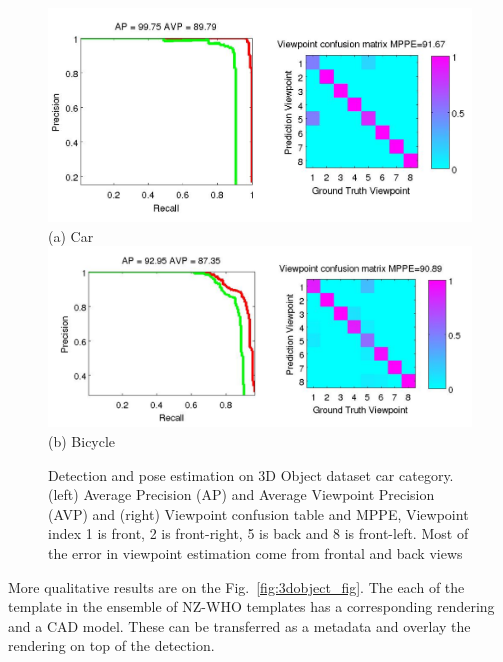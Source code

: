 \documentclass[10pt,twocolumn,letterpaper]{article}
\begin{document}
\begin{figure}[h]
  \centering
  \includegraphics[width=0.99\linewidth]{supp/car_ap_3dobject_tight.png}\\
  \vspace{-5pt}
  (a) Car\\
  \includegraphics[width=0.99\linewidth]{supp/bicycle_ap_3dobject_tight.png}\\
  \vspace{-5pt}
  (b) Bicycle
\caption{Detection and pose estimation on 3D Object dataset car category. (left) Average Precision (AP) and Average Viewpoint Precision (AVP) and (right) Viewpoint confusion table and MPPE, Viewpoint index 1 is front, 2 is front-right, 5 is back and 8 is front-left. Most of the error in viewpoint estimation come from frontal and back views}%
  \label{fig:3dobject_ap}
\end{figure}

More qualitative results are on the Fig.~\ref{fig:3dobject_fig}. The each of the template in the ensemble of NZ-WHO templates has a corresponding rendering and a CAD model. These can be transferred as a metadata and overlay the rendering on top of the detection.
\end{document}
